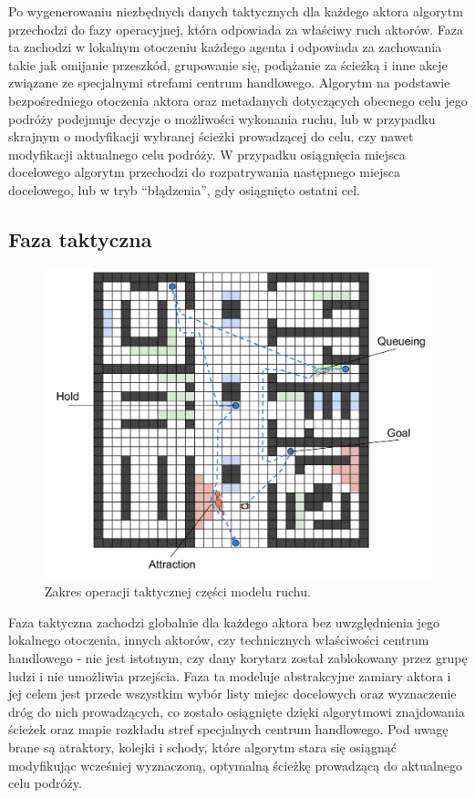 \documentclass[a4paper, 12pt]{article}
\begin{document}
    Po wygenerowaniu niezbędnych danych taktycznych dla każdego aktora algorytm przechodzi do fazy operacyjnej, która odpowiada za właściwy ruch aktorów. Faza ta zachodzi w lokalnym otoczeniu każdego agenta i odpowiada za zachowania takie jak omijanie przeszkód, grupowanie się, podążanie za ścieżką i inne akcje związane ze specjalnymi strefami centrum handlowego.
Algorytm na podstawie bezpośredniego otoczenia aktora oraz metadanych dotyczących obecnego celu jego podróży podejmuje decyzje o możliwości wykonania ruchu, lub w przypadku skrajnym o modyfikacji wybranej ścieżki prowadzącej do celu, czy nawet modyfikacji aktualnego celu podróży.
W przypadku osiągnięcia miejsca docelowego algorytm przechodzi do rozpatrywania następnego miejsca docelowego, lub w tryb ``błądzenia'', gdy osiągnięto ostatni cel.

\newpage
        \subsection{Faza taktyczna}
        \label{sec:tactical}

        \begin{figure}[h!]
            \centering
            \includegraphics[scale=0.3]{./img/Tactical.pdf}
            \caption{Zakres operacji taktycznej części modelu ruchu.}
            \label{fig:tactical}
        \end{figure}


        \noindent
        Faza taktyczna zachodzi globalnie dla każdego aktora bez uwzględnienia jego lokalnego otoczenia, innych aktorów, czy technicznych właściwości centrum handlowego - nie jest istotnym, czy dany korytarz został zablokowany przez grupę ludzi i nie umożliwia przejścia. Faza ta modeluje abstrakcyjne zamiary aktora i jej celem jest przede wszystkim wybór listy miejsc docelowych oraz wyznaczenie dróg do nich prowadzących, co zostało osiągnięte dzięki algorytmowi znajdowania ścieżek oraz mapie rozkładu stref specjalnych centrum handlowego. Pod uwagę brane są atraktory, kolejki i schody, które algorytm stara się osiągnąć modyfikując wcześniej wyznaczoną, optymalną ścieżkę prowadzącą do aktualnego celu podróży.
\end{document}
